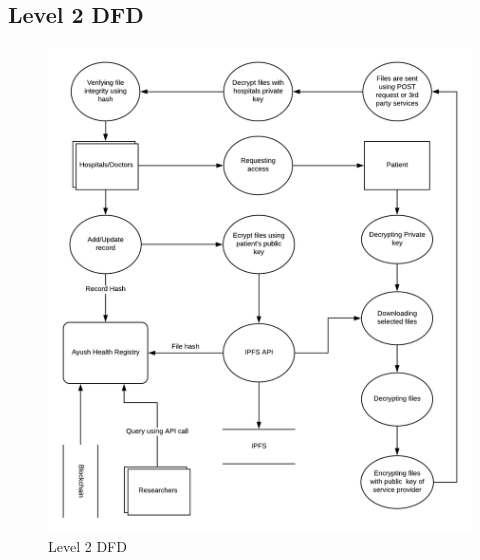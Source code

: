 \documentclass[11pt]{report}
\begin{document}
    \subsection{Level 2 DFD}
    \begin{figure}[h!]
        \centering
        \includegraphics[scale=0.9]{DFD2.png}
        \caption{Level 2 DFD}
        \label{fig:my_label}
    \end{figure}
    \newpage
   
\end{document}
